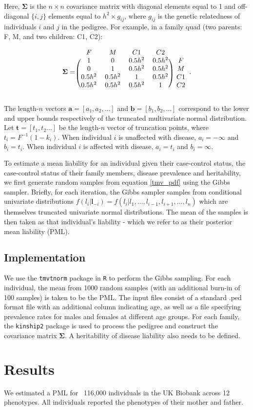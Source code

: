 \documentclass{article}
\begin{document}
\noindent Here, $\boldsymbol{\Sigma}$ is the $n \times n$ covariance matrix with diagonal elements equal to 1 and off-diagonal $\{i,j\}$ elements equal to $h^2 \times g_{ij}$, where $g_{ij}$ is the genetic relatedness of individuals $i$ and $j$ in the pedigree. For example, in a family quad (two parents: F, M, and two children: C1, C2):

\[
\boldsymbol{\Sigma}=\begin{blockarray}{ccccc}
F & M & C1 & C2 \\
\begin{block}{(cccc)c}
 1 & 0 & 0.5h^2 & 0.5h^2 & F \\
 0 & 1 & 0.5h^2 & 0.5h^2 & M \\
 0.5h^2 & 0.5h^2 & 1 & 0.5h^2 & C1 \\
 0.5h^2 & 0.5h^2 & 0.5h^2 & 1 & C2 \\
\end{block}
\end{blockarray}.
 \]

\noindent The length-$n$ vectors $\boldsymbol{a} = [a_1,a_2,...]$ and $\boldsymbol{b} = [b_1,b_2,...]$ correspond to the lower and upper bounds respectively of the truncated multivariate normal distribution. Let $\boldsymbol{t} = [t_1,t_2...]$ be the length-$n$ vector of truncation points, where $t_i = F^{-1}(1-k_i)$. When individual $i$ is unaffected with disease, $a_i = -\infty$ and $b_i = t_i$. When individual $i$ is affected with disease, $a_i = t_i$ and $b_i = \infty$.

To estimate a mean liability for an individual given their case-control status, the case-control status of their family members, disease prevalence and heritability, we first generate random samples from equation \ref{tmv_pdf} using the Gibbs sampler. Briefly, for each iteration, the Gibbs sampler samples from conditional univariate distributions $f(l_i | \boldsymbol{l}_{-i}) = f(l_i | l_1,...,l_{i-1},l_{i+1},...,l_n)$ which are themselves truncated univariate normal distributions. The mean of the samples is then taken as that individual's liability - which we refer to as their posterior mean liability (PML).

\subsection{Implementation}
We use the \texttt{tmvtnorm} package in \texttt{R} to perform the Gibbs sampling. For each individual, the mean from 1000 random samples (with an additional burn-in of 100 samples) is taken to be the PML. The input files consist of a standard .ped format file with an additional column indicating age, as well as a file specifying prevalence rates for males and females at different age groups. For each family, the \texttt{kinship2} package is used to process the pedigree and construct the covariance matrix $\boldsymbol{\Sigma}$. A heritability of disease liability also needs to be defined.

\section{Results}
We estimated a PML for ~116,000 individuals in the UK Biobank across 12 phenotypes. All individuals reported the phenotypes of their mother and father. 
\end{document}
